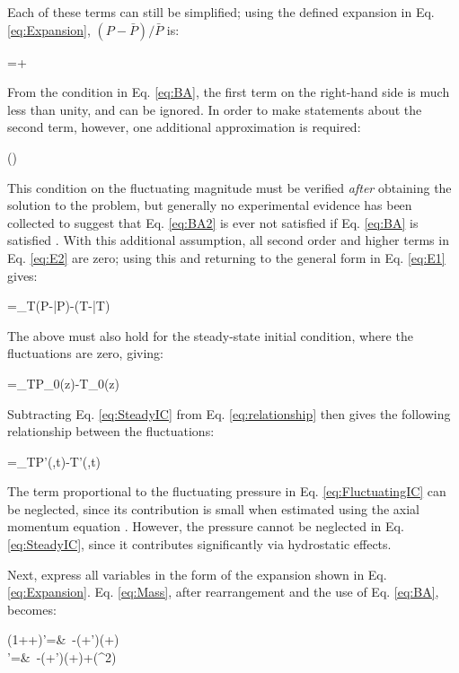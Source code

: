 \documentclass[10pt]{article}
\numberwithin{equation}{section} %
\begin{document}
Each of these terms can still be simplified; using the defined expansion in Eq. \eqref{eq:Expansion}, \((P-\bar{P})/\bar{P}\) is:

\beq
{}=+
\eeq

From the condition in Eq. \eqref{eq:BA}, the first term on the right-hand side is much less than unity, and can be ignored. In order to make statements about the second term, however, one additional approximation is required:

\beq
\label{eq:BA2}
\le{}(\epsilon)
\eeq

This condition on the fluctuating magnitude must be verified {\it after} obtaining the solution to the problem, but generally no experimental evidence has been collected to suggest that Eq. \eqref{eq:BA2} is ever not satisfied if Eq. \eqref{eq:BA} is satisfied \cite{spiegel}. With this additional assumption, all second order and higher terms in Eq. \eqref{eq:E2} are zero; using this and returning to the general form in Eq. \eqref{eq:E1} gives:

\beq
\label{eq:relationship}
\frac{\rho-\bar{\rho}}{\bar{\rho}}=\alpha_T\left(P-\bar{P}\right)-\beta\left(T-\bar{T}\right)
\eeq

The above must also hold for the steady-state initial condition, where the fluctuations are zero, giving:

\beq
\label{eq:SteadyIC}
=\alpha_TP_0(z)-\beta T_0(z)
\eeq

Subtracting Eq. \eqref{eq:SteadyIC} from Eq. \eqref{eq:relationship} then gives the following relationship between the fluctuations:

\beq
\label{eq:FluctuatingIC}
=\alpha_TP'(,t)-\beta T'(,t)
\eeq

The term proportional to the fluctuating pressure in Eq. \eqref{eq:FluctuatingIC} can be neglected, since its contribution is small when estimated using the axial momentum equation \cite{spiegel}. However, the pressure cannot be neglected in Eq. \eqref{eq:SteadyIC}, since it contributes significantly via hydrostatic effects.

Next, express all variables in the form of the expansion shown in Eq. \eqref{eq:Expansion}. Eq. \eqref{eq:Mass}, after rearrangement and the use of Eq. \eqref{eq:BA}, becomes:

\beqa
\left(1++\right)\nabla\cdot{}'=&\ -\left(+'\cdot\nabla\right)\left(+\right)\\
\nabla\cdot{}'=&\ -\left(+'\cdot\nabla\right)\left\lbrack\epsilon\left(+\right)\right\rbrack+(\epsilon^2)\\
\eeqa
\end{document}

